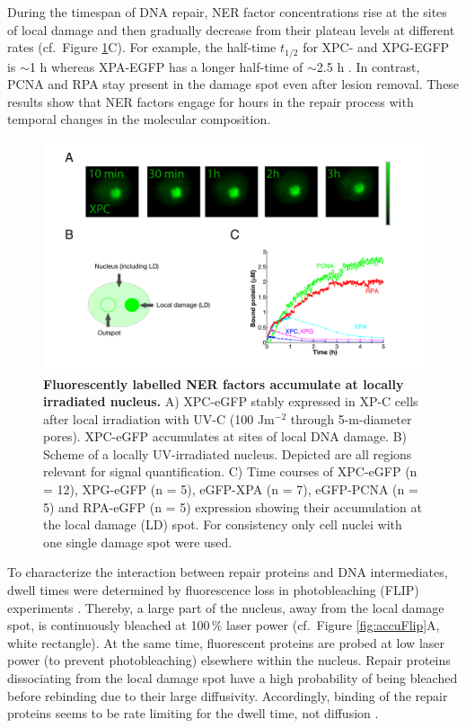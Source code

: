 During the timespan of DNA repair, NER factor concentrations rise at the sites of local damage and then gradually decrease from their plateau levels at different rates (cf.\ Figure \ref{fig:accuImage}C). For example, the half-time $t_\text{1/2}$ for XPC- and XPG-EGFP is $\sim$1 h whereas XPA-EGFP has a longer half-time of $\sim$2.5 h \cite{Luijsterburg2010}. In contrast, PCNA and RPA stay present in the damage spot even after lesion removal. These results show that NER factors engage for hours in the repair process with temporal changes in the molecular composition.\\
\begin{figure}[t!]
	\begin{center}
		\includegraphics[width=1\textwidth]{Abbildungen/figure2_2.pdf}
		\caption{\textbf{Fluorescently labelled NER factors accumulate at locally irradiated nucleus.} A) XPC-eGFP  stably expressed in XP-C cells  after local irradiation with UV-C (100 J$\text{m}^{-\text{2}}$ through 5-\textmu m-diameter pores). XPC-eGFP accumulates at sites of local DNA damage.  B) Scheme of a locally UV-irradiated nucleus. Depicted are all regions relevant for signal quantification. C) Time courses of XPC-eGFP (n = 12), XPG-eGFP (n = 5), eGFP-XPA (n = 7), eGFP-PCNA (n = 5) and RPA-eGFP (n = 5) expression showing their accumulation at the local damage (LD) spot. For consistency only cell nuclei with one single damage spot were used.}
		\label{fig:accuImage}
	\end{center}
\end{figure}
To characterize the interaction between repair proteins and DNA intermediates, dwell times were determined by fluorescence loss in photobleaching (FLIP) experiments \cite{Luijsterburg2010}. Thereby, a large part of the nucleus, away from the local damage spot, is continuously bleached at 100\,\% laser power (cf.\ Figure \ref{fig:accuFlip}A, white rectangle). At the same time, fluorescent proteins are probed at low laser power (to prevent photobleaching) elsewhere within the nucleus. Repair proteins dissociating from the local damage spot have a high probability of being bleached before rebinding due to their large diffusivity. Accordingly, binding of the repair proteins seems to be rate limiting for the dwell time, not diffusion \cite{Luijsterburg2010}.\\
